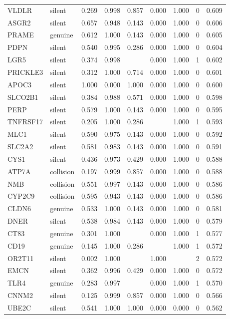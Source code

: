 \begin{longtable}{llrrrrrrr}
VLDLR & silent & 0.269 & 0.998 & 0.857 & 0.000 & 1.000 & 0 & 0.609\\
ASGR2 & silent & 0.657 & 0.948 & 0.143 & 0.000 & 1.000 & 0 & 0.606\\
PRAME & genuine & 0.612 & 1.000 & 0.143 & 0.000 & 1.000 & 0 & 0.605\\
PDPN & silent & 0.540 & 0.995 & 0.286 & 0.000 & 1.000 & 0 & 0.604\\
LGR5 & silent & 0.374 & 0.998 &  & 0.000 & 1.000 & 1 & 0.602\\
PRICKLE3 & silent & 0.312 & 1.000 & 0.714 & 0.000 & 1.000 & 0 & 0.601\\
APOC3 & silent & 1.000 & 0.000 & 1.000 & 0.000 & 1.000 & 0 & 0.600\\
SLCO2B1 & silent & 0.384 & 0.988 & 0.571 & 0.000 & 1.000 & 0 & 0.598\\
PERP & silent & 0.579 & 1.000 & 0.143 & 0.000 & 1.000 & 0 & 0.595\\
TNFRSF17 & silent & 0.205 & 1.000 & 0.286 &  & 1.000 & 1 & 0.593\\
MLC1 & silent & 0.590 & 0.975 & 0.143 & 0.000 & 1.000 & 0 & 0.592\\
SLC2A2 & silent & 0.581 & 0.983 & 0.143 & 0.000 & 1.000 & 0 & 0.591\\
CYS1 & silent & 0.436 & 0.973 & 0.429 & 0.000 & 1.000 & 0 & 0.588\\
ATP7A & collision & 0.197 & 0.999 & 0.857 & 0.000 & 1.000 & 0 & 0.588\\
NMB & collision & 0.551 & 0.997 & 0.143 & 0.000 & 1.000 & 0 & 0.586\\
CYP2C9 & collision & 0.595 & 0.943 & 0.143 & 0.000 & 1.000 & 0 & 0.586\\
CLDN6 & genuine & 0.533 & 1.000 & 0.143 & 0.000 & 1.000 & 0 & 0.581\\
DNER & silent & 0.538 & 0.984 & 0.143 & 0.000 & 1.000 & 0 & 0.579\\
CT83 & genuine & 0.301 & 1.000 &  & 0.000 & 1.000 & 1 & 0.577\\
CD19 & genuine & 0.145 & 1.000 & 0.286 &  & 1.000 & 1 & 0.572\\
OR2T11 & silent & 0.002 & 1.000 &  & 1.000 &  & 2 & 0.572\\
EMCN & silent & 0.362 & 0.996 & 0.429 & 0.000 & 1.000 & 0 & 0.572\\
TLR4 & genuine & 0.283 & 0.997 &  & 0.000 & 1.000 & 1 & 0.570\\
CNNM2 & silent & 0.125 & 0.999 & 0.857 & 0.000 & 1.000 & 0 & 0.566\\
UBE2C & silent & 0.541 & 1.000 & 1.000 & 0.000 & 0.000 & 0 & 0.562\\

\end{longtable}
